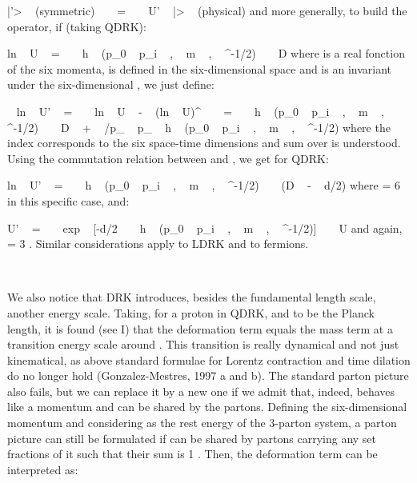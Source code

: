 \documentclass[a4paper,12pt,dvips]{article}
\begin{document}
\equation
|\psi '> ~ (symmetric) ~ ~ = ~ ~ U' ~ |\psi> ~ (physical)
\endequation
\noindent 
and more generally, to build the \coordHE{} operator, if (taking QDRK):

\equation
ln ~ U ~ = ~ ~ h ~ (p_0 ~ p_i ~ , ~ m ~ , ~ \epsilon ^{-1/2}) ~ ~ D
\endequation
\noindent 
where \coordHE{} is a real fonction of the six momenta, \coordHE{} is defined in the six-dimensional space and \coordHE{} is an invariant under the six-dimensional \coordHE{} , we just define:

 ~ ln ~ U' ~ = ~ ~ ln ~ U ~ - ~ (ln ~ U)^{\dagger } ~ ~ = ~ ~ h ~ (p_0 ~ p_i ~ , ~ m ~ , ~ \epsilon ^{-1/2}) ~ ~ D ~ + ~ \partial /\partial p_{\beta} ~ p_{\beta} ~ h ~ (p_0 ~ p_i ~ , ~ m ~ , ~ \epsilon ^{-1/2})
\endequation
\noindent
where the index \myHighlight{$\beta $}\coordHE{} corresponds to the six space-time dimensions and sum over \myHighlight{$\beta $}\coordHE{} is understood. Using the commutation relation between \coordHE{} and \coordHE{}, we get for QDRK:

\equation
ln ~ U' ~ = ~ ~ h ~ (p_0 ~ p_i ~ , ~ m ~ , ~ \epsilon ^{-1/2}) ~ ~ (D ~ - ~ d/2)
\endequation
\noindent 
where \coordHE{} = 6 in this specific case, and:

\equation
U' ~ = ~ ~ exp ~ [-d/2 ~ ~ h ~ (p_0 ~ p_i ~ , ~ m ~ , ~ \epsilon ^{-1/2})] ~ ~ U
\endequation
\noindent 
and again, \coordHE{} = 3 . Similar considerations apply to LDRK and to fermions.

~

We also notice that DRK introduces, besides the fundamental length scale, another energy scale. Taking, for a proton in QDRK, \coordHE{} and \coordHE{} to be the Planck length, it is found (see I) that the deformation term equals the mass term at a transition energy scale around \coordHE{}. This transition is really dynamical and not just kinematical, as above \coordHE{} standard formulae for Lorentz contraction and time dilation do no longer hold (Gonzalez-Mestres, 1997 a and b). The standard parton picture also fails, but we can replace it by a new one if we admit that, indeed, \coordHE{} behaves like a momentum and can be shared by the partons. Defining the six-dimensional momentum \coordHE{} and considering \coordHE{} as the rest energy of the 3-parton system, a parton picture can still be formulated if \coordHE{} can be shared by partons carrying any set fractions of it such that their sum is 1 . Then, the deformation term \coordHE{} can be interpreted as:
\end{document}
